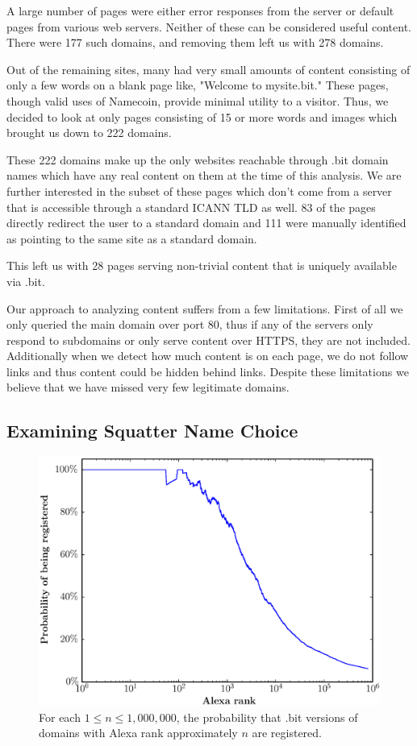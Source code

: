A large number of pages were either error responses from the server or default pages from various web servers. Neither of these can be considered useful content. There were 177 such domains, and removing them left us with 278 domains.

Out of the remaining sites, many had very small amounts of content consisting of only a few words on a blank page like, "Welcome to mysite.bit." These pages, though valid uses of Namecoin, provide minimal utility to a visitor. Thus, we decided to look at only pages consisting of 15 or more words and images which brought us down to 222 domains.

These 222 domains make up the only websites reachable through .bit domain names which have any real content on them at the time of this analysis. We are further interested in the subset of these pages which don't come from a server that is accessible through a standard ICANN TLD as well.  83 of the pages directly redirect the user to a standard domain and 111 were manually identified as pointing to the same site as a standard domain.

This left us with 28 pages serving non-trivial content that is uniquely available via .bit.

Our approach to analyzing content suffers from a few limitations. First of all we only queried the main domain over port 80, thus if any of the servers only respond to subdomains or only serve content over HTTPS, they are not included. Additionally when we detect how much content is on each page, we do not follow links and thus content could be hidden behind links. Despite these limitations we believe that we have missed very few legitimate domains.

\subsection{Examining Squatter Name Choice}

\begin{figure}[t]
  \centering
  \includegraphics[width=\columnwidth]{figures/alexa_probability}
  \caption{For each $1 \leq n \leq 1,000,000$, the probability that .bit versions of domains with Alexa rank approximately $n$ are registered.}
  \label{fig:alexa_probability}
\end{figure}

